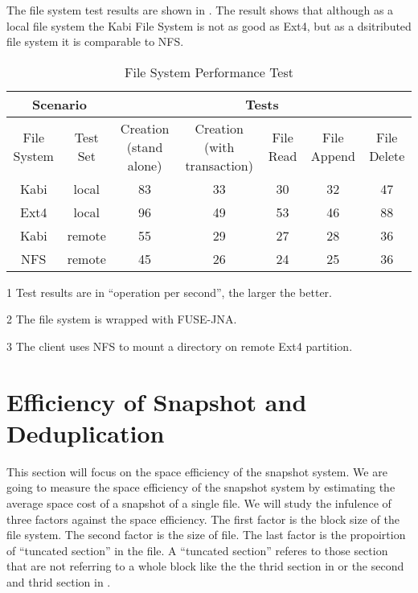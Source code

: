     The file system test results are shown in . The result shows that although as a local file system the Kabi File System is not as good as Ext4, but as a dsitributed file system it is comparable to NFS.

\begin{lscape} 
\begin{table}
\caption{File System Performance Test}
\label{tab:fs_performance}
\begin{center}
\begin{threeparttable}
\begin{tabular}{|c|c|c|c|c|c|c|}
\hline
\multicolumn{2}{|c|}{Scenario} & \multicolumn{5}{c|}{Tests\tnote{1}} \\
\hline
File System & Test Set & Creation (stand alone) & Creation (with transaction) & File Read & File Append & File Delete\\
\hline
Kabi & local & 83 & 33 & 30 & 32 & 47 \\
\hline
Ext4\tnote{2}& local & 96 & 49 & 53 & 46 & 88 \\
\hline
Kabi & remote & 55 & 29 & 27 & 28 & 36 \\
\hline
NFS \tnote{2,3} & remote & 45 & 26 & 24 & 25 & 36 \\
\hline
\end{tabular}
\begin{tablenotes}
\item[1] Test results are in ``operation per second'', the larger the better.
\item[2] The file system is wrapped with FUSE-JNA.
\item[3] The client uses NFS to mount a directory on remote Ext4 partition.
\end{tablenotes}
\end{threeparttable}
\end{center}
\end{table}
\end{lscape} 

\section {Efficiency of Snapshot and Deduplication}

    This section will focus on the space efficiency of the snapshot system. We are going to measure the space efficiency of the snapshot system by estimating the average space cost of a snapshot of a single file. We will study the infulence of three factors against the space efficiency. The first factor is the block size of the file system. The second factor is the size of file. The last factor is the propoirtion of ``tuncated section'' in the file. A ``tuncated section'' referes to those section that are not referring to a whole block like the the thrid section in  or the second and thrid section in .

